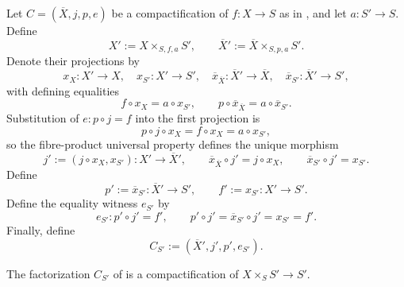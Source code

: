 \begin{definition}
  \label{def:nagata-compactification-base-change}

  Let $C=(\overline X,j,p,e)$ be a compactification of
  $f\colon X\to S$ as in , and let
  $a\colon S'\to S$.  Define
  \[
    X':=X\times_{S,f,a}S',
    \qquad
    \overline X':=\overline X\times_{S,p,a}S'.
  \]
  Denote their projections by
  \[
    x_X\colon X'\to X,
    \quad x_{S'}\colon X'\to S',
    \quad
    \overline x_{\overline X}\colon\overline X'\to\overline X,
    \quad \overline x_{S'}\colon\overline X'\to S',
  \]
  with defining equalities
  \[
    f\circ x_X=a\circ x_{S'},
    \qquad
    p\circ\overline x_{\overline X}=a\circ\overline x_{S'}.
  \]
  Substitution of $e\colon p\circ j=f$ into the first projection is
  \[
    p\circ j\circ x_X
      =f\circ x_X
      =a\circ x_{S'},
  \]
  so the fibre-product universal property defines the unique morphism
  \[
    j':=(j\circ x_X,x_{S'})\colon X'\longrightarrow\overline X',
    \qquad
    \overline x_{\overline X}\circ j'=j\circ x_X,
    \qquad
    \overline x_{S'}\circ j'=x_{S'}.
  \]
  Define
  \[
    p':=\overline x_{S'}\colon\overline X'\to S',
    \qquad
    f':=x_{S'}\colon X'\to S'.
  \]
  Define the equality witness $e_{S'}$ by
  \[
    e_{S'}\colon p'\circ j'=f',
    \qquad
    p'\circ j'
      =\overline x_{S'}\circ j'
      =x_{S'}=f'.
  \]
  Finally, define
  \[
    C_{S'}:=(\overline X',j',p',e_{S'}).
  \]
\end{definition}

\begin{lemma}
  \label{lemma:nagata-compactification-base-change}

  The factorization $C_{S'}$ of
   is a compactification of
  $X\times_SS'\to S'$.
\end{lemma}

